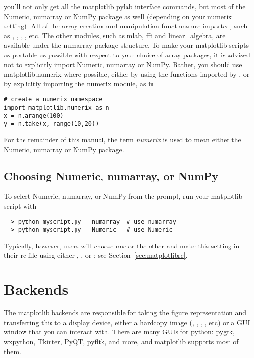 \documentclass[twoside]{book}
\begin{document}
\noindent you'll not only get all the matplotlib pylab interface
commands, but most of the Numeric, numarray or NumPy package as well
(depending on your numerix setting).  All of the array creation and
manipulation functions are imported, such as ,
, , , etc.  The other modules,
such as mlab, fft and linear\_algebra, are available under the numarray
package structure.  To make your matplotlib scripts as portable as
possible with respect to your choice of array packages, it is advised
not to explicitly import Numeric, numarray or NumPy.  Rather, you should use
matplotlib.numerix where possible, either by using the functions
imported by , or by explicitly importing the numerix
module, as in

\begin{lstlisting}
# create a numerix namespace
import matplotlib.numerix as n
x = n.arange(100)
y = n.take(x, range(10,20))
\end{lstlisting}

For the remainder of this manual, the term \textit{numerix} is used to
mean either the Numeric, numarray or NumPy package.

\subsection{Choosing Numeric, numarray, or NumPy}

To select Numeric, numarray, or NumPy from the prompt, run your matplotlib
script with

\begin{verbatim}
  > python myscript.py --numarray  # use numarray
  > python myscript.py --Numeric   # use Numeric
\end{verbatim}


\noindent  Typically, however, users will choose one or the other and
make this setting in their rc file using either , 
, or ; see Section~\ref{sec:matplotlibrc}.


\section{Backends}
\label{sec:intro_backends}

The matplotlib backends are responsible for taking the figure
representation and transferring this to a display device, either a
hardcopy image (, , ,
, etc) or a GUI window that you can interact with.  There
are many GUIs for python: pygtk, wxpython, Tkinter, PyQT, pyfltk, and
more, and matplotlib supports most of them.  
\end{document}
